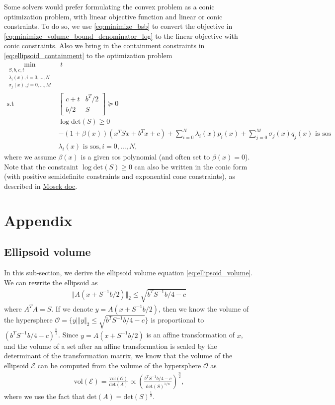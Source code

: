 \documentclass{article}
\begin{document}
Some solvers would prefer formulating the convex problem as a conic optimization problem, with linear objective function and linear or conic constraints. To do so, we use \eqref{eq:minimize_bsb} to convert the objective in \eqref{eq:minimize_volume_bound_denominator_log} to the linear objective with conic constraints. Also we bring in the containment constraints in \eqref{eq:ellipsoid_containment} to the optimization problem
\begin{subequations}
\begin{align}
	\min_{\substack{S, b, c, t\\ \lambda_i(x), i=0,\hdots,N\\ \sigma_j(x), j=0,\hdots,M}}& \; t\\
	\text{s.t }& \begin{bmatrix} c + t & b^T/2 \\ b/2 & S\end{bmatrix} \succeq 0\\
		&\log\text{det}(S) \ge 0\\
	&-(1+\beta(x))(x^TSx + b^Tx + c) + \sum_{i=0}^N \lambda_i(x) p_i(x) + \sum_{j=0}^M\sigma_j(x)q_j(x)\text{ is sos}\\
	&\lambda_i(x) \text{ is sos}, i=0,\hdots, N,
\end{align}
\end{subequations}
where we assume $\beta(x)$ is a given sos polynomial (and often set to $\beta(x) = 0$). Note that the constraint $\log\text{det}(S) \ge 0$ can also be written in the conic form (with positive semidefinite constraints and exponential cone constraints), as described in \href{https://docs.mosek.com/modeling-cookbook/sdo.html#log-determinant}{Mosek doc}.

\section{Appendix}
\subsection{Ellipsoid volume}
In this sub-section, we derive the ellipsoid volume equation \eqref{eq:ellipsoid_volume}. We can rewrite the ellipsoid as
\begin{align}
	\Vert A(x+S^{-1}b/2)\Vert_2 \le \sqrt{b^TS^{-1}b/4-c}
\end{align}
where $A^TA = S$. If we denote $y = A(x + S^{-1}b/2)$, then we know the volume of the hypersphere $\mathcal{O} = \{y | \Vert y\Vert_2\le \sqrt{b^TS^{-1}b/4-c}\}$ is proportional to $(b^TS^{-1}b/4-c)^{\frac{n}{2}}$. Since $y=A(x+S^{-1}b/2)$ is an affine transformation of $x$, and the volume of a set after an affine transformation is scaled by the determinant of the transformation matrix, we know that the volume of the ellipsoid $\mathcal{E}$ can be computed from the volume of the hypersphere $\mathcal{O}$ as
\begin{align}
	\text{vol}(\mathcal{E}) = \frac{\text{vol}(\mathcal{O})}{\text{det}(A)} \propto \left(\frac{b^TS^{-1}b/4-c}{\text{det}(S)^{1/n}}\right)^{\frac{n}{2}},
\end{align}
where we use the fact that $\text{det}(A) = \text{det}(S)^{\frac{1}{2}}$.
\end{document}
